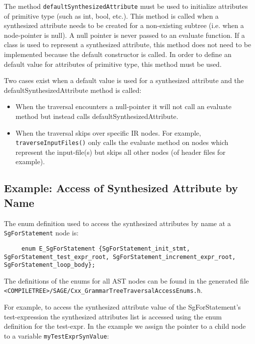    The method {\tt defaultSynthesizedAttribute} must be used to initialize attributes of
primitive type (such as int, bool, etc.).  This method is called when a synthesized
attribute needs to be created for a non-existing subtree  (i.e. when a node-pointer is
null). A null pointer is never passed to an evaluate function. If a class is used to
represent a synthesized attribute, this method does not need to be implemented because
the default constructor is called. In order to define an default value for attributes
of primitive type, this method must be used.

   Two cases exist when a default value is used for a synthesized attribute
and the defaultSynthesizedAttribute method is called:
\begin{itemize}
\item When the traversal encounters a null-pointer it will not call an evaluate method but
      instead calls defaultSynthesizedAttribute.
\item When the traversal skips over specific IR nodes. For example, 
      {\tt traverseInputFiles()} only calls the evaluate method on nodes which represent
      the input-file(s) but skips all other nodes (of header files for example).
\end{itemize}


\subsection{Example: Access of Synthesized Attribute by Name}

The enum definition used to access the synthesized attributes by name at 
a {\tt SgForStatement} node is:
{\indent
{\mySmallFontSize
\begin{verbatim}
     enum E_SgForStatement {SgForStatement_init_stmt, SgForStatement_test_expr_root, SgForStatement_increment_expr_root, SgForStatement_loop_body};
\end{verbatim}
}}
The definitions of the enums for all AST nodes can be found in the generated file
\verb+<COMPILETREE>/SAGE/Cxx_GrammarTreeTraversalAccessEnums.h+.

For example, to access the synthesized attribute value of the SgForStatement's
test-expression the synthesized attributes list is accessed using the enum definition
for the test-expr. In the example we assign the pointer to a child node to a variable
{\tt myTestExprSynValue}:

